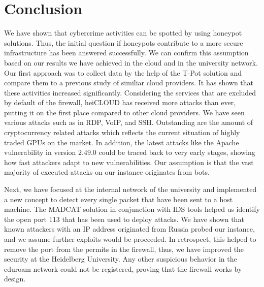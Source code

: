 \chapter{Conclusion}

We have shown that cybercrime activities can be spotted by using honeypot solutions.
Thus, the initial question if honeypots contribute to a more secure infrastructure has been answered successfully.
We can confirm this assumption based on our results we have achieved in the cloud and in the university network.
Our first approach was to collect data by the help of the T-Pot solution and compare them to a previous study of similiar cloud providers.
It has shown that these activities increased significantly.
Considering the services that are excluded by default of the firewall, heiCLOUD has received more attacks than ever, putting it on the first place compared to other cloud providers.
We have seen various attacks such as in RDP, VoIP, and SSH.
Outstanding are the amount of cryptocurrency related attacks which reflects the current situation of highly traded GPUs on the market.
In addition, the latest attacks like the Apache vulnerability in version $2.49.0$ could be traced back to very early stages, showing how fast attackers adapt to new vulnerabilities.
Our assumption is that the vast majority of executed attacks on our instance originates from bots.

Next, we have focused at the internal network of the university and implemented a new concept to detect every single packet that have been sent to a host machine.
The MADCAT solution in conjunction with IDS tools helped us identify the open port 113 that has been used to deploy attacks.
We have shown that known attackers with an IP address originated from Russia probed our instance, and we assume further exploits would be proceeded.
In retrospect, this helped to remove the port from the permits in the firewall, thus, we have improved the security at the Heidelberg University.
Any other suspicious behavior in the eduroam network could not be registered, proving that the firewall works by design.

